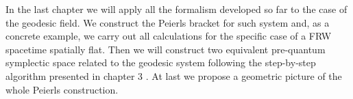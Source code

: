 \documentclass[Main]{subfiles}
\begin{document}
In the last chapter we will apply all the formalism developed so far to the case of the geodesic field.
We construct the Peierls bracket for such system and, as a  concrete example, we carry out all calculations for the specific case of a FRW spacetime spatially flat.
Then we will construct two equivalent pre-quantum symplectic space related to the geodesic system following the step-by-step algorithm presented in chapter 3 .
At last we propose a geometric picture of the whole Peierls construction.
\end{document}
